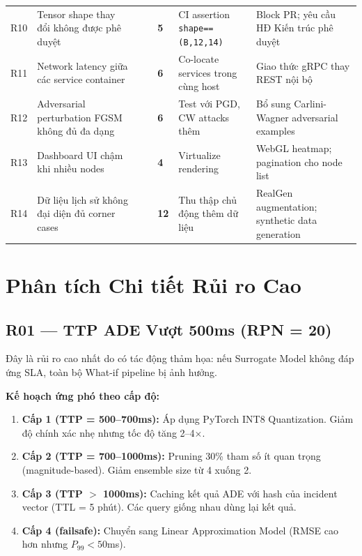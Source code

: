 \begin{landscape}
\begin{table}[H]
\begin{tabular}{>{\centering}p{0.8cm} p{3.5cm} >{\centering}p{1cm} >{\centering}p{1cm} >{\centering}p{1cm} p{4cm} p{4cm}}
\rowcolor{rowgray}
R10 & Tensor shape thay đổi không được phê duyệt & 1 & 5 & \cellcolor{alertyellow!40}\textbf{5} & CI assertion \texttt{shape==(B,12,14)} & Block PR; yêu cầu HĐ Kiến trúc phê duyệt \\
R11 & Network latency giữa các service container & 3 & 2 & \cellcolor{alertgreen!50}\textbf{6} & Co-locate services trong cùng host & Giao thức gRPC thay REST nội bộ \\
\rowcolor{rowgray}
R12 & Adversarial perturbation FGSM không đủ đa dạng & 2 & 3 & \cellcolor{alertgreen!50}\textbf{6} & Test với PGD, CW attacks thêm & Bổ sung Carlini-Wagner adversarial examples \\
R13 & Dashboard UI chậm khi nhiều nodes & 2 & 2 & \cellcolor{alertgreen!40}\textbf{4} & Virtualize rendering & WebGL heatmap; pagination cho node list \\
\rowcolor{rowgray}
R14 & Dữ liệu lịch sử không đại diện đủ corner cases & 3 & 4 & \cellcolor{alertred!40}\textbf{12} & Thu thập chủ động thêm dữ liệu & RealGen augmentation; synthetic data generation \\
\bottomrule
\end{tabular}
\end{table}
\end{landscape}

\section{Phân tích Chi tiết Rủi ro Cao}

\subsection{R01 --- TTP ADE Vượt 500ms (RPN = 20)}

Đây là rủi ro cao nhất do có tác động thảm họa: nếu Surrogate Model không đáp ứng SLA, toàn bộ What-if pipeline bị ảnh hưởng.

\textbf{Kế hoạch ứng phó theo cấp độ:}
\begin{enumerate}[leftmargin=1.5cm, itemsep=4pt]
  \item \textbf{Cấp 1 (TTP = 500--700ms):} Áp dụng PyTorch INT8 Quantization. Giảm độ chính xác nhẹ nhưng tốc độ tăng 2--4$\times$.
  \item \textbf{Cấp 2 (TTP = 700--1000ms):} Pruning 30\% tham số ít quan trọng (magnitude-based). Giảm ensemble size từ 4 xuống 2.
  \item \textbf{Cấp 3 (TTP $>$ 1000ms):} Caching kết quả ADE với hash của incident vector (TTL = 5 phút). Các query giống nhau dùng lại kết quả.
  \item \textbf{Cấp 4 (failsafe):} Chuyển sang Linear Approximation Model (RMSE cao hơn nhưng $P_{99} < 50$ms).
\end{enumerate}

